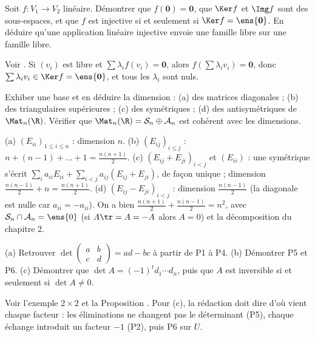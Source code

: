 \begin{exo}
Soit $f:V_1\to V_2$ linéaire. Démontrer que $f(\mathbf 0)=\mathbf 0$, que $\Ker f$ et $\Img f$ sont des sous-espaces, et que $f$ est injective si et seulement si $\Ker f=\ens{\mathbf 0}$. En déduire qu'une application linéaire injective envoie une famille libre sur une famille libre.
\begin{corrige}
Voir . Si $(v_i)$ est libre et $\sum\lambda_if(v_i)=\mathbf 0$, alors $f(\sum\lambda_iv_i)=\mathbf 0$, donc $\sum\lambda_iv_i\in\Ker f=\ens{\mathbf 0}$, et tous les $\lambda_i$ sont nuls.
\end{corrige}
\end{exo}
\begin{exo}\label{exo-dim-matrices}
Exhiber une base et en déduire la dimension : (a) des matrices diagonales ; (b) des triangulaires supérieures ; (c) des symétriques ; (d) des antisymétriques de $\Mat_n(\R)$. Vérifier que $\Mat_n(\R)=\mathcal S_n\oplus\mathcal A_n$ est cohérent avec les dimensions.
\begin{corrige}
(a) $(E_{ii})_{1\le i\le n}$ : dimension $n$. (b) $(E_{ij})_{i\le j}$ : $n+(n-1)+\dots+1=\frac{n(n+1)}2$. (c) $(E_{ij}+E_{ji})_{i<j}$ et $(E_{ii})$ : une symétrique s'écrit $\sum_ia_{ii}E_{ii}+\sum_{i<j}a_{ij}(E_{ij}+E_{ji})$, de façon unique ; dimension $\frac{n(n-1)}2+n=\frac{n(n+1)}2$. (d) $(E_{ij}-E_{ji})_{i<j}$ : dimension $\frac{n(n-1)}2$ (la diagonale est nulle car $a_{ii}=-a_{ii}$). On a bien $\frac{n(n+1)}2+\frac{n(n-1)}2=n^2$, avec $\mathcal S_n\cap\mathcal A_n=\ens{0}$ (si $A\tr=A=-A$ alors $A=0$) et la décomposition du chapitre 2.
\end{corrige}
\end{exo}
\begin{exo}
(a) Retrouver $\det\begin{pmatrix}a&b\\c&d\end{pmatrix}=ad-bc$ à partir de P1 à P4. (b) Démontrer P5 et P6. (c) Démontrer que $\det A=(-1)^td_1\cdots d_n$, puis que $A$ est inversible si et seulement si $\det A\neq0$.
\begin{corrige}
Voir l'exemple $2\times2$ et la Proposition . Pour (c), la rédaction doit dire d'où vient chaque facteur : les éliminations ne changent pas le déterminant (P5), chaque échange introduit un facteur $-1$ (P2), puis P6 sur $U$.
\end{corrige}
\end{exo}
